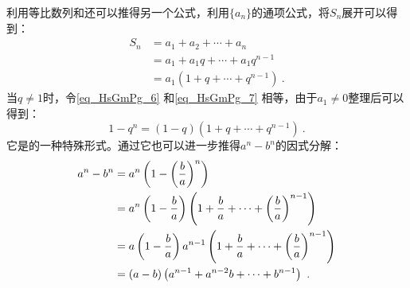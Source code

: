 利用等比数列和还可以推得另一个公式，利用$\{a_n\}$的通项公式，将$S_n$展开可以得到：
\begin{equation}\label{eq_HsGmPg_7}
\begin{aligned}
S_n& = a_1 + a_2 + \cdots + a_n \\
&= a_1+a_1q+ \cdots + a_1q^{n-1}\\
&= a_1(1+q+ \cdots +q^{n-1})~.
\end{aligned}
\end{equation}
当$q\neq1$时，令\autoref{eq_HsGmPg_6} 和\autoref{eq_HsGmPg_7} 相等，由于$a_1\neq0$整理后可以得到：
\begin{equation}
1 - q^n=(1-q)(1+q+ \cdots +q^{n-1})~.
\end{equation}
它是的一种特殊形式。通过它也可以进一步推得$a^n-b^n$的因式分解：
\begin{equation}
\begin{aligned}
a^n-b^n& = a^n\left(1-\left({b\over a}\right)^n\right)\\
&= a^n\left(1-{b\over a}\right)\left(1+{b\over a}+\cdots+\left({b\over a}\right)^{n-1}\right)\\
&= a\left(1-{b\over a}\right)a^{n-1}\left(1+{b\over a}+\cdots+\left({b\over a}\right)^{n-1}\right)\\
&= \left(a-b\right)\left(a^{n-1}+a^{n-2}b+\cdots+b^{n-1}\right)~.
\end{aligned}
\end{equation}

